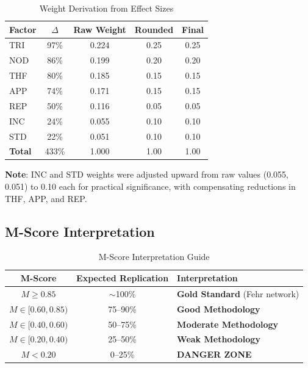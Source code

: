 \documentclass[11pt,a4paper]{article}
\begin{document}
\begin{table}[h]
\centering
\caption{Weight Derivation from Effect Sizes}
\label{tab:weights}
\begin{tabular}{lcccc}
\toprule
\textbf{Factor} & \textbf{$\Delta$} & \textbf{Raw Weight} & \textbf{Rounded} & \textbf{Final} \\
\midrule
TRI & 97\% & 0.224 & 0.25 & 0.25 \\
NOD & 86\% & 0.199 & 0.20 & 0.20 \\
THF & 80\% & 0.185 & 0.15 & 0.15 \\
APP & 74\% & 0.171 & 0.15 & 0.15 \\
REP & 50\% & 0.116 & 0.05 & 0.05 \\
INC & 24\% & 0.055 & 0.10 & 0.10 \\
STD & 22\% & 0.051 & 0.10 & 0.10 \\
\midrule
\textbf{Total} & 433\% & 1.000 & 1.00 & 1.00 \\
\bottomrule
\end{tabular}
\end{table}

\textbf{Note}: INC and STD weights were adjusted upward from raw values (0.055, 0.051) to 0.10 each for practical significance, with compensating reductions in THF, APP, and REP.

\subsection{M-Score Interpretation}

\begin{table}[h]
\centering
\caption{M-Score Interpretation Guide}
\label{tab:interpretation}
\begin{tabular}{ccl}
\toprule
\textbf{M-Score} & \textbf{Expected Replication} & \textbf{Interpretation} \\
\midrule
$M \geq 0.85$ & $\sim$100\% & \textcolor{eslgreen}{\textbf{Gold Standard}} (Fehr network) \\
$M \in [0.60, 0.85)$ & 75--90\% & \textcolor{eslblue}{\textbf{Good Methodology}} \\
$M \in [0.40, 0.60)$ & 50--75\% & \textcolor{eslorange}{\textbf{Moderate Methodology}} \\
$M \in [0.20, 0.40)$ & 25--50\% & \textcolor{eslred}{\textbf{Weak Methodology}} \\
$M < 0.20$ & 0--25\% & \textcolor{dangerzone}{\textbf{DANGER ZONE}} \\
\bottomrule
\end{tabular}
\end{table}
\end{document}
